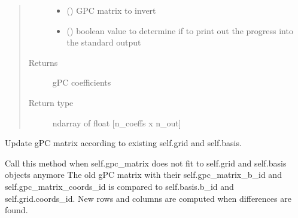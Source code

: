 \documentclass[letterpaper,10pt,english,openany,oneside]{sphinxmanual}
\begin{document}
\begin{fulllineitems}
\begin{fulllineitems}
\begin{quote}
\begin{description}
\begin{itemize}
\item {} 
 (\sphinxstyleliteralemphasis{\sphinxupquote{ {[}}}\sphinxstyleliteralemphasis{\sphinxupquote{{]}}}\sphinxstyleliteralemphasis{\sphinxupquote{, }}\sphinxstyleliteralemphasis{\sphinxupquote{, }}) \textendash{} GPC matrix to invert

\item {} 
 () \textendash{} boolean value to determine if to print out the progress into the standard output

\end{itemize}

\item[{Returns}] \leavevmode
{} \textendash{} gPC coefficients

\item[{Return type}] \leavevmode
ndarray of float {[}n\_coeffs x n\_out{]}

\end{description}\end{quote}

\end{fulllineitems}


\begin{fulllineitems}
\label{\detokenize{pygpc:pygpc.GPC.GPC.update_gpc_matrix}}
Update gPC matrix according to existing self.grid and self.basis.

Call this method when self.gpc\_matrix does not fit to self.grid and self.basis objects anymore
The old gPC matrix with their self.gpc\_matrix\_b\_id and self.gpc\_matrix\_coords\_id is compared
to self.basis.b\_id and self.grid.coords\_id. New rows and columns are computed when differences are found.

\end{fulllineitems}



\end{fulllineitems}
\end{document}
